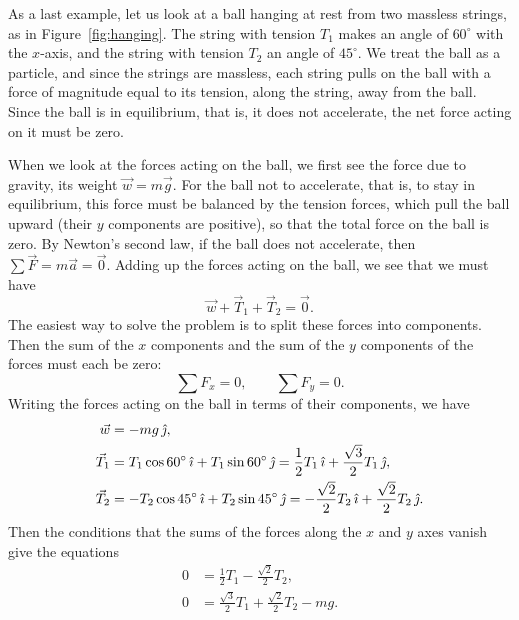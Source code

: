 \documentclass[11pt,a4paper]{article}
\begin{document}
As a last example, let us look at a ball hanging at rest from two massless strings, as in
Figure~\ref{fig:hanging}. The string with tension $T_1$ makes an angle of $60^\circ$ with the
$x$-axis, and the string with tension $T_2$ an angle of $45^\circ$. We treat the ball as a particle,
and since the strings are massless, each string pulls on the ball with a force of magnitude equal to
its tension, along the string, away from the ball. Since the ball is in equilibrium, that is, it
does not accelerate, the net force acting on it must be zero.

When we look at the forces acting on the ball, we first see the force due to gravity, its weight
$\vec{w} = m\vec{g}$. For the ball not to accelerate, that is, to stay in equilibrium, this force
must be balanced by the tension forces, which pull the ball upward (their $y$ components are
positive), so that the total force on the ball is zero. By Newton's second law, if the ball does not accelerate, then
$\sum\vec{F} = m\vec{a} = \vec{0}$. Adding up the forces acting on the ball, we see that we must
have
\begin{equation}\label{eq:hang-sum}
  \vec{w} + \vec{T}_1 + \vec{T}_2 = \vec{0} .
\end{equation}
The easiest way to solve the problem is to split these forces into components. Then the sum of the
$x$ components and the sum of the $y$ components of the forces must each be zero:
\begin{equation}\label{eq:hang-components}
  \sum F_x = 0 , \qquad \sum F_y = 0 .
\end{equation}
Writing the forces acting on the ball in terms of their components, we have
\begin{equation}\label{eq:hang-forces}
  \begin{aligned}
    \vec{w} &= -mg\,\hat{\jmath} , \\
    \vec{T}_1 &= T_1\cos 60^\circ\,\hat{\imath} + T_1\sin 60^\circ\,\hat{\jmath}
      = \frac{1}{2}T_1\,\hat{\imath} + \frac{\sqrt{3}}{2}T_1\,\hat{\jmath} , \\
    \vec{T}_2 &= -T_2\cos 45^\circ\,\hat{\imath} + T_2\sin 45^\circ\,\hat{\jmath}
      = -\frac{\sqrt{2}}{2}T_2\,\hat{\imath} + \frac{\sqrt{2}}{2}T_2\,\hat{\jmath} .
  \end{aligned}
\end{equation}
Then the conditions that the sums of the forces along the $x$ and $y$ axes vanish give the equations
\begin{equation}\label{eq:hang-eqs}
  \begin{aligned}
    0 &= \frac{1}{2}T_1 - \frac{\sqrt{2}}{2}T_2 , \\
    0 &= \frac{\sqrt{3}}{2}T_1 + \frac{\sqrt{2}}{2}T_2 - mg .
  \end{aligned}
\end{equation}
\end{document}
